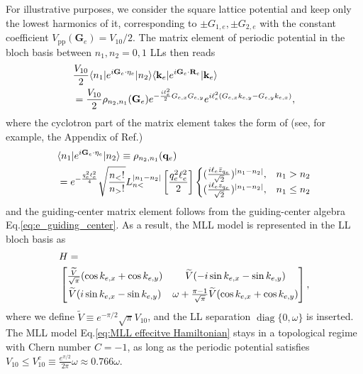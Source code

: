 For illustrative purposes, we consider the square lattice potential and keep only the lowest harmonics of it, corresponding to $\pm G_{1,e},\pm G_{2,e}$ with the constant coefficient $V_{\text{pp}}(\mathbf{G}_e)=V_{10}/2$. The matrix element of periodic potential in the bloch basis between $n_1,n_2=0,1$ LLs then reads
\begin{align}
    &\frac{V_{10}}{2}\langle n_1|e^{i\mathbf{G}_e\cdot\eta_e}|n_2\rangle \langle\mathbf{k}_e|e^{i\mathbf{G}_e\cdot\mathbf{R}_e}|\mathbf{k}_e\rangle\notag\\
    &=\frac{V_{10}}{2}\rho_{n_2,n_1}(\mathbf{G}_e) e^{-\frac{i\ell_e^2}{2}G_{e,x} G_{e,y}} e^{i\ell_e^2 (G_{e,x}k_{e,y}-G_{e,y}k_{e,x})},
\end{align}
where the cyclotron part of the matrix element takes the form of (see, for example, the Appendix of Ref.\cite{murthy2003hamiltonian})
\begin{align*}
&\langle n_1|e^{i\mathbf{G}_e\cdot\eta_e}|n_2\rangle\equiv\rho_{n_2,n_1}(\mathbf{q}_e)\notag\\
&=e^{-\frac{q_e^2\ell_e^2}{4}}\sqrt{\frac{n_<!}{n_>!}} L_{n<}^{|n_1-n_2|}\left[\frac{q_e^2\ell_e^2}{2}\right]\begin{cases}
    (\tfrac{i\ell_e\bar z_{q_e}}{\sqrt{2}})^{|n_1-n_2|},&n_1>n_2\\
    (\tfrac{i\ell_e z_{q_e}}{\sqrt{2}})^{|n_1-n_2|}, &n_1\leq n_2\\
\end{cases}
\end{align*}
and the guiding-center matrix element follows from the guiding-center algebra Eq.\eqref{eq:e_guiding_center}. As a result, the MLL model is represented in the LL bloch basis \cite{murthy2012hamiltonian} as 
\begin{align}\label{eq:MLL effecitve Hamiltonian}
    &H=\notag\\
    &\begin{bmatrix}
        \frac{\widetilde{V}}{\sqrt\pi}(\cos k_{e,x}+\cos k_{e,y}) & \widetilde{V}(-i\sin k_{e,x}-\sin k_{e,y}) \\[0.5em]
        \widetilde{V}(i\sin k_{e,x}-\sin k_{e,y}) & \omega+\frac{\pi-1}{\sqrt{\pi}}\widetilde{V}(\cos k_{e,x}+\cos k_{e,y}) 
    \end{bmatrix},
\end{align}
where we define $\widetilde{V}\equiv e^{-\pi/2}\sqrt{\pi}V_{10}$, and the LL separation $\mathop{\mathrm{diag}}\{0, \omega\}$ is inserted. The MLL model Eq.\eqref{eq:MLL effecitve Hamiltonian} stays in a topological regime with Chern number $C=-1$, as long as the periodic potential satisfies $V_{10}\leq V_{10}^c\equiv\frac{e^{\pi/2}}{2\pi}\omega\approx0.766\omega$.

